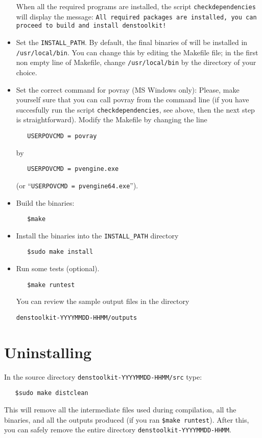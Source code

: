 \begin{itemize}
When all the required programs are installed, the script \texttt{checkdependencies} will display the message: \texttt{All required packages are installed, you can proceed to build and install denstoolkit!}
\item Set the \texttt{INSTALL\_PATH}. By default, the final binaries of \DTK{} will be installed in \texttt{/usr/local/bin}. You can change this by editing the Makefile file; in the first non empty line of Makefile, change \texttt{/usr/local/bin} by the directory of your choice.
\item Set the correct command for povray (MS Windows only): Please, make yourself sure that you can call povray from the command line (if you have succesfully run the script \texttt{checkdependencies}, see above, then the next step is straightforward). Modify the Makefile by changing the line
\begin{verbatim}
   USERPOVCMD = povray
\end{verbatim}
by
\begin{verbatim}
   USERPOVCMD = pvengine.exe
\end{verbatim}
(or ``\texttt{USERPOVCMD = pvengine64.exe}'').
\item Build the \DTK{} binaries:
\begin{verbatim}
   $make
\end{verbatim}
\item Install the binaries into the \texttt{INSTALL\_PATH} directory
\begin{verbatim}
   $sudo make install
\end{verbatim}
\item Run some tests (optional).
\begin{verbatim}
   $make runtest
\end{verbatim}
 You can review the sample output files in the directory 
 
 \texttt{denstoolkit-YYYYMMDD-HHMM/outputs}
\end{itemize}

\section{Uninstalling \DTK}

In the source directory \texttt{denstoolkit-YYYYMMDD-HHMM/src} type:
\begin{verbatim}
   $sudo make distclean
\end{verbatim}
This will remove all the intermediate files used during compilation, all the binaries, and all the outputs produced (if you ran \texttt{\$make runtest}). After this, you can safely remove the entire directory \texttt{denstoolkit-YYYYMMDD-HHMM}.








